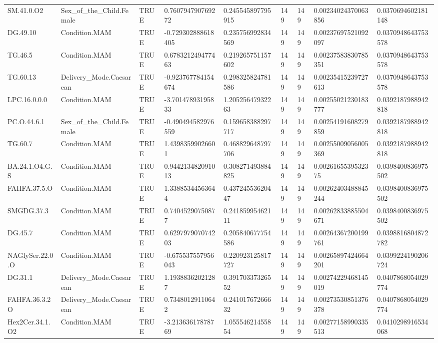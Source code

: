 \begin{longtable}{lllllllll}
SM.41.0.O2 & Sex\_of\_the\_Child.Female & TRUE & 0.760794790769272 & 0.245545897795915 & 149 & 149 & 0.00234024370063856 & 0.0370694602181148 \\
DG.49.10 & Condition.MAM & TRUE & -0.729302888618405 & 0.235756992834569 & 149 & 149 & 0.00237697521092097 & 0.0370948643753578 \\
TG.46.5 & Condition.MAM & TRUE & 0.678321249477463 & 0.219265751157602 & 149 & 149 & 0.00237583830785351 & 0.0370948643753578 \\
TG.60.13 & Delivery\_Mode.Caesarean & TRUE & -0.923767784154674 & 0.298325824781586 & 149 & 149 & 0.00235415239727613 & 0.0370948643753578 \\
LPC.16.0.0.0 & Condition.MAM & TRUE & -3.70147893195833 & 1.20525647932263 & 149 & 149 & 0.00255021230183777 & 0.0392187988942818 \\
PC.O.44.6.1 & Sex\_of\_the\_Child.Female & TRUE & -0.490494582976559 & 0.159658388297717 & 149 & 149 & 0.00254191608279859 & 0.0392187988942818 \\
TG.60.7 & Condition.MAM & TRUE & 1.43983599026601 & 0.468829648797706 & 149 & 149 & 0.00255009056005369 & 0.0392187988942818 \\
BA.24.1.O4.G.S & Condition.MAM & TRUE & 0.944213482091013 & 0.308271493884825 & 149 & 149 & 0.0026165539532375 & 0.0398400836975502 \\
FAHFA.37.5.O & Condition.MAM & TRUE & 1.33885344563644 & 0.43724553620447 & 149 & 149 & 0.00262403488845244 & 0.0398400836975502 \\
SMGDG.37.3 & Condition.MAM & TRUE & 0.74045290750877 & 0.24185995462111 & 149 & 149 & 0.00262833885504671 & 0.0398400836975502 \\
DG.45.7 & Condition.MAM & TRUE & 0.629797907074203 & 0.205840677754586 & 149 & 149 & 0.00264367200199761 & 0.0398816804872782 \\
NAGlySer.22.0.O & Condition.MAM & TRUE & -0.675537557956043 & 0.220923125817727 & 149 & 149 & 0.00265897424664201 & 0.0399224190206724 \\
DG.31.1 & Delivery\_Mode.Caesarean & TRUE & 1.19388362021287 & 0.39170337326552 & 149 & 149 & 0.00274229468145019 & 0.0407868054029774 \\
FAHFA.36.3.2O & Delivery\_Mode.Caesarean & TRUE & 0.73480129110642 & 0.24101767266632 & 149 & 149 & 0.00273530851376378 & 0.0407868054029774 \\
Hex2Cer.34.1.O2 & Condition.MAM & TRUE & -3.21363617878769 & 1.05554621455854 & 149 & 149 & 0.00277158990335513 & 0.0410298916534068 \\

\end{longtable}
